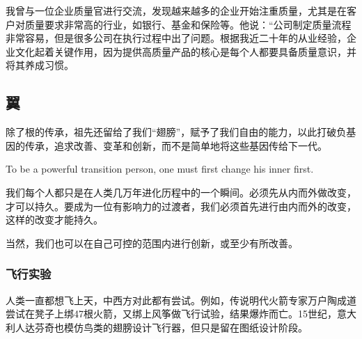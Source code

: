 我曾与一位企业质量官进行交流，发现越来越多的企业开始注重质量，尤其是在客户对质量要求非常高的行业，如银行、基金和保险等。他说：``公司制定质量流程非常容易，但是很多公司在执行过程中出了问题。根据我近二十年的从业经验，企业文化起着关键作用，因为提供高质量产品的核心是每个人都要具备质量意识，并将其养成习惯。

\hypertarget{ux7ffc}{%
\subsection{翼}\label{ux7ffc}}

除了根的传承，祖先还留给了我们``翅膀''，赋予了我们自由的能力，以此打破负基因的传承，追求改善、变革和创新，而不是简单地将这些基因传给下一代。

To be a powerful transition person, one must first change his inner
first.

我们每个人都只是在人类几万年进化历程中的一个瞬间。必须先从内而外做改变，才可以持久。要成为一位有影响力的过渡者，我们必须首先进行由内而外的改变，这样的改变才能持久。

当然，我们也可以在自己可控的范围内进行创新，或至少有所改善。

\hypertarget{ux98deux884cux5b9eux9a8c}{%
\subsubsection{飞行实验}\label{ux98deux884cux5b9eux9a8c}}

人类一直都想飞上天，中西方对此都有尝试。例如，传说明代火箭专家万户陶成道尝试在凳子上绑47根火箭，又绑上风筝做飞行试验，结果爆炸而亡。15世纪，意大利人达芬奇也模仿鸟类的翅膀设计飞行器，但只是留在图纸设计阶段。

